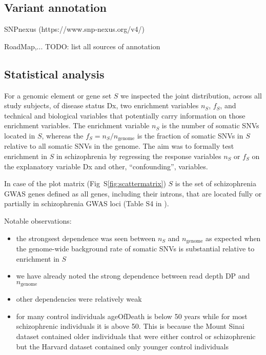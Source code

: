 \documentclass[letterpaper]{article}
\begin{document}
\subsection{Variant annotation}

SNPnexus (https://www.snp-nexus.org/v4/)

RoadMap,... TODO: list all sources of annotation

\subsection{Statistical analysis}

For a genomic element or gene set  \(S\) we inspected the joint distribution,
across all study subjects, of disease status Dx, two enrichment variables
\(n_S\), \(f_S\), and technical and biological variables that potentially
carry information on those enrichment variables.  The enrichment variable
\(n_S\) is the number of somatic SNVs located in \(S\), whereas the \(f_S =
	n_S/n_\mathrm{genome}\) is the fraction of somatic SNVs in \(S\)
relative to all somatic SNVs in the genome.  The aim was to formally test
enrichment in \(S\) in schizophrenia by regressing the response variables
\(n_S\) or \(f_S\) on the explanatory variable Dx
and other, ``confounding'', variables.

In case of the plot matrix (Fig~S\ref{fig:scattermatrix}) \(S\) is the set of schizophrenia GWAS genes
defined as all genes, including their introns, that are located fully or
partially in schizophrenia GWAS loci (Table S4 in \cite{Pardinas2018}).

Notable observations:
\begin{itemize}
	\item the strongsest dependence was seen between \(n_S\) and \(n_\mathrm{genome}\) as expected
		when the genome-wide background rate of somatic SNVs is
		substantial relative to enrichment in \(S\)
	\item we have already noted the strong dependence between read depth DP and
		\(n_\mathrm{genome}\)
        \item other dependencies were relatively weak
	\item for many control individuals ageOfDeath is below 50 years while for
		most schizophrenic individuals it is above 50.  This is
		because the Mount Sinai dataset contained older individuals
		that were either control or schizophrenic but the Harvard dataset contained
		only younger control individuals
\end{itemize}
\end{document}
